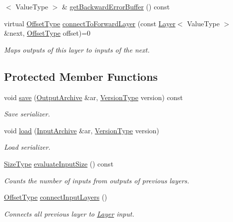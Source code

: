 \begin{DoxyCompactItemize}
$<$ Value\-Type $>$ \& \hyperlink{classffnn_1_1layer_1_1_layer_a015929efb02c020e7890e0da441bf918}{get\-Backward\-Error\-Buffer} () const 
\item 
virtual \hyperlink{classffnn_1_1layer_1_1internal_1_1_interface_adc5bb454329ebd51ac26579a43c006fd}{Offset\-Type} \hyperlink{classffnn_1_1layer_1_1_layer_a430276d228f0bf349f0b03b2bdaecba8}{connect\-To\-Forward\-Layer} (const \hyperlink{classffnn_1_1layer_1_1_layer}{Layer}$<$ Value\-Type $>$ \&next, \hyperlink{classffnn_1_1layer_1_1internal_1_1_interface_adc5bb454329ebd51ac26579a43c006fd}{Offset\-Type} offset)=0
\begin{DoxyCompactList}\small\item\em Maps outputs of this layer to inputs of the next. \end{DoxyCompactList}\end{DoxyCompactItemize}
\subsection*{Protected Member Functions}
\begin{DoxyCompactItemize}
\item 
void \hyperlink{classffnn_1_1layer_1_1_layer_ac265fc929a178b111337226dd1cb62b6}{save} (\hyperlink{classffnn_1_1traits_1_1_serializable_a08d986df75d363fa79506d4f6045cb9f}{Output\-Archive} \&ar, \hyperlink{classffnn_1_1traits_1_1_serializable_a08924b3b7d20cb3cb6eafe517d4f7b30}{Version\-Type} version) const 
\begin{DoxyCompactList}\small\item\em Save serializer. \end{DoxyCompactList}\item 
void \hyperlink{classffnn_1_1layer_1_1_layer_a23f5f3c958d888632010327471c7b012}{load} (\hyperlink{classffnn_1_1traits_1_1_serializable_a6e626759259f8f370dd4303b4441a234}{Input\-Archive} \&ar, \hyperlink{classffnn_1_1traits_1_1_serializable_a08924b3b7d20cb3cb6eafe517d4f7b30}{Version\-Type} version)
\begin{DoxyCompactList}\small\item\em Load serializer. \end{DoxyCompactList}\item 
\hyperlink{classffnn_1_1layer_1_1internal_1_1_interface_af0567642f60c65b5e87067226a54174b}{Size\-Type} \hyperlink{classffnn_1_1layer_1_1_layer_afdc489e04b2b1e716940f598ac474e4c}{evaluate\-Input\-Size} () const 
\begin{DoxyCompactList}\small\item\em Counts the number of inputs from outputs of previous layers. \end{DoxyCompactList}\item 
\hyperlink{classffnn_1_1layer_1_1internal_1_1_interface_adc5bb454329ebd51ac26579a43c006fd}{Offset\-Type} \hyperlink{classffnn_1_1layer_1_1_layer_a9d692bce889ddc693e5bac8dda5d4cd2}{connect\-Input\-Layers} ()
\begin{DoxyCompactList}\small\item\em Connects all previous layer to \hyperlink{classffnn_1_1layer_1_1_layer}{Layer} input. \end{DoxyCompactList}\end{DoxyCompactItemize}
